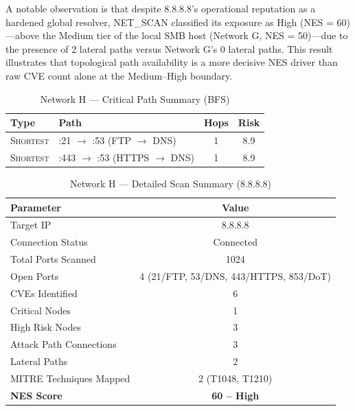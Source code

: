 \documentclass[conference]{IEEEtran}
\begin{document}
A notable observation is that despite 8.8.8.8's operational reputation as a hardened global resolver, NET\_SCAN classified its exposure as High (NES = 60)---above the Medium tier of the local SMB host (Network G, NES = 50)---due to the presence of 2 lateral paths versus Network G's 0 lateral paths. This result illustrates that topological path availability is a more decisive NES driver than raw CVE count alone at the Medium--High boundary.

\begin{table}[htbp]
\caption{Network H --- Critical Path Summary (BFS)}
\begin{center}
\begin{tabular}{|l|l|c|c|}
\hline
\textbf{Type} & \textbf{Path} & \textbf{Hops} & \textbf{Risk} \\
\hline
\textsc{Shortest} & :21 $\to$ :53 (FTP $\to$ DNS) & 1 & 8.9 \\
\hline
\textsc{Shortest} & :443 $\to$ :53 (HTTPS $\to$ DNS) & 1 & 8.9 \\
\hline
\end{tabular}
\label{tab:paths_netH}
\end{center}
\end{table}

\begin{table}[htbp]
\caption{Network H --- Detailed Scan Summary (8.8.8.8)}
\begin{center}
\begin{tabular}{|l|c|}
\hline
\textbf{Parameter} & \textbf{Value} \\
\hline
Target IP & 8.8.8.8 \\
\hline
Connection Status & Connected \\
\hline
Total Ports Scanned & 1024 \\
\hline
Open Ports & 4 (21/FTP, 53/DNS, 443/HTTPS, 853/DoT) \\
\hline
CVEs Identified & 6 \\
\hline
Critical Nodes & 1 \\
\hline
High Risk Nodes & 3 \\
\hline
Attack Path Connections & 3 \\
\hline
Lateral Paths & 2 \\
\hline
MITRE Techniques Mapped & 2 (T1048, T1210) \\
\hline
\textbf{NES Score} & \textbf{60 -- High} \\
\hline
\end{tabular}
\label{tab:netH_detail}
\end{center}
\end{table}
\end{document}
